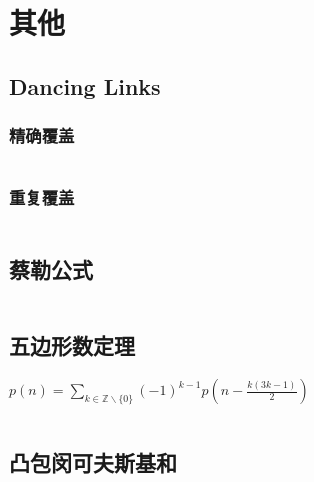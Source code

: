 \section{其他}
\subsection{Dancing Links}
\subsubsection{精确覆盖}
\inputminted{cpp}{\source/others/exact.cpp}
\subsubsection{重复覆盖}
\inputminted{cpp}{\source/others/rader.cpp}
\subsection{蔡勒公式}
\inputminted{cpp}{\source/others/zellers-congruence.cpp}
\subsection{五边形数定理}
$p(n) = \sum_{k \in \mathbb{Z} \backslash \{0\}} (-1)^{k - 1}p(n - \frac{k(3k-1)}{2})$
\inputminted{cpp}{\source/others/partition.cpp}
\subsection{凸包闵可夫斯基和}
\inputminted{cpp}{\source/others/mink.cpp}
